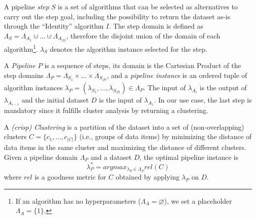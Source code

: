 A pipeline \textit{step} $S$ is a set of algorithms that can be selected as alternatives to carry out the step goal, including the possibility to return the dataset as-is through the ``Identity'' algorithm $I$.
%
The step domain is defined as $\Lambda_S = \Lambda_{A_1} \cupdot \ldots \cupdot \Lambda_{A_{|S|}}$, therefore the disjoint union of the domain of each algorithm\footnote{If an algorithm has no hyperparameters ($\Lambda_{A} = \varnothing$), we set a placeholder $\Lambda_{A} = \{ 1 \}$.}. $\lambda_{S}$ denotes the algorithm instance selected for the step.
%

A \textit{Pipeline} $P$ is a sequence of steps, its domain is the Cartesian Product of the step domains $\Lambda_P = \Lambda_{S_1} \times \ldots \times \Lambda_{S_{|P|}}$, and a \textit{pipeline instance} is an ordered tuple of algorithm instances $\lambda_P = (\lambda_{S_1}, \ldots, \lambda_{S_{|P|}}) \in \Lambda_P$.
The input of $\lambda_{A_i}$ is the output of $\lambda_{A_{i-1}}$ and the initial dataset $D$ is the input of $\lambda_{A_{1}}$.
In our use case, the last step is mandatory since it fulfills cluster analysis by returning a clustering.

A \textit{(crisp) Clustering} is a partition of the dataset into a set of (non-overlapping) clusters  $C=\{c_1, \ldots, c_{|C|}\}$ (i.e., groups of data items) by minimizing the distance of data items in the same cluster and maximizing the distance of different clusters. 
Given a pipeline domain $\Lambda_P$ and a dataset $D$, the optimal pipeline instance is 
\begin{equation}
\label{eq:optimization}
    \lambda_P^* = argmax_{\lambda_P \in \Lambda_P} rel(C)
\end{equation}
where $rel$ is a goodness metric for $C$ obtained by applying $\lambda_P$ on $D$.

\vspace{-0.3cm}
